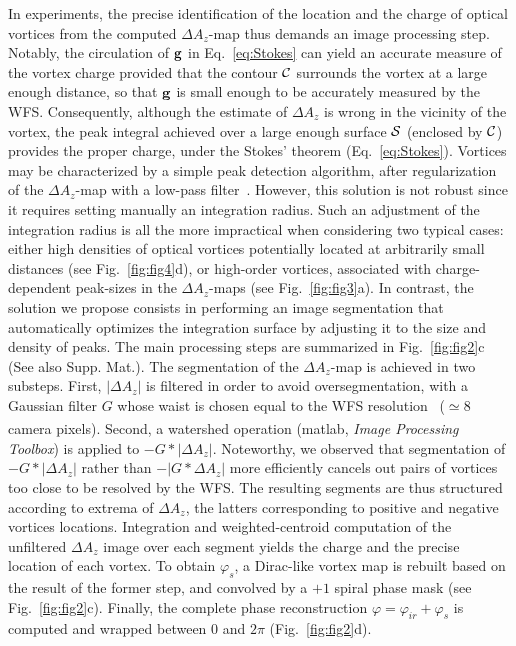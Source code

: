 \documentclass[10pt,twocolumn,twoside,letterpaper]{article}
\begin{document}
In experiments, the precise identification of the location and the charge of optical vortices from the computed $\Delta A_z$-map thus demands an image processing step. Notably, the circulation of ${\bf g}$ in Eq.~\eqref{eq:Stokes} can yield an accurate measure of the vortex charge provided that the contour ${\cal C}$ surrounds the vortex at a large enough distance, so that ${\bf g}$ is small enough to be accurately measured by the WFS. Consequently, although the estimate of $\Delta A_z$ is wrong in the vicinity of the vortex, the peak integral achieved over a large enough surface ${\cal S}$ (enclosed by ${\cal C}$) provides the proper charge, under the Stokes' theorem (Eq.~\eqref{eq:Stokes}). 
Vortices may be characterized by a simple peak detection algorithm, after regularization of the $\Delta A_z$-map with a low-pass filter~\cite{Tikhomirova_JOSA_02}. However, this solution is not robust since it requires setting manually an integration radius. Such an adjustment of the integration radius is all the more impractical when considering two typical cases: either high densities of optical vortices potentially located at arbitrarily small distances (see Fig.~\ref{fig:fig4}d), or high-order vortices, associated with charge-dependent peak-sizes in the $\Delta A_z$-maps (see Fig.~\ref{fig:fig3}a).
In contrast, the solution we propose consists in performing an image segmentation that automatically optimizes the integration surface by adjusting it to the size and density of peaks. The main processing steps are summarized in Fig.~\ref{fig:fig2}c (See also Supp. Mat.). 
The segmentation of the $\Delta A_z$-map is achieved in two substeps. 
First, $|\Delta A_z|$ is filtered in order to avoid oversegmentation, with a Gaussian filter $G$ whose waist is chosen equal to the WFS resolution~\cite{Berto_OL_17} ($\simeq 8$ camera pixels). 
Second, a watershed operation (matlab\textsuperscript{\tiny\textregistered}, \emph{Image Processing Toolbox}) is applied to $-G\ast|\Delta A_z|$. Noteworthy, we observed that segmentation of $-G\ast|\Delta A_z|$ rather than $-|G\ast\Delta A_z|$ more efficiently cancels out pairs of vortices too close to be resolved by the WFS. The resulting segments are thus structured according to extrema of $\Delta A_z$, the latters corresponding to positive and negative vortices locations.
Integration and weighted-centroid computation of the unfiltered $\Delta A_z$ image over each segment yields the charge and the precise location of each vortex. To obtain $\varphi_s$, a Dirac-like vortex map is rebuilt based on the result of the former step, and convolved by a $+1$ spiral phase mask (see Fig.~\ref{fig:fig2}c). Finally, the complete phase reconstruction $\varphi=\varphi_{ir}+\varphi_s$ is computed and wrapped between $0$ and $2\pi$ (Fig.~\ref{fig:fig2}d). 
\end{document}
